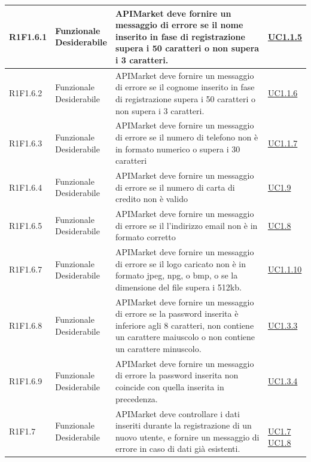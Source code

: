 \documentclass[12pt,a4paper,titlepage]{article}
\newcommand{\minitab}[2][1]{\begin{tabular}#1 #2\end{tabular}}
\newcommand{\uc}[1]{\hyperref[UC#1]{UC#1}}
\begin{document}
{\begin{longtable}{|m{5em}|m{6em}|m{28em}|m{5em}|}
			\hline
			R1F1.6.1 & \minitab[c]{Funzionale\\Desiderabile} & APIMarket deve fornire un messaggio di errore se il nome inserito in fase di registrazione supera i 50 caratteri o non supera i 3 caratteri. & \uc{1.1.5}\\
			\hline
			R1F1.6.2 & \minitab[c]{Funzionale\\Desiderabile} & APIMarket deve fornire un messaggio di errore se il cognome inserito in fase di registrazione supera i 50 caratteri o non supera i 3 caratteri. & \uc{1.1.6}\\
			\hline
			R1F1.6.3 & \minitab[c]{Funzionale\\Desiderabile} & APIMarket deve fornire un messaggio di errore se il numero di telefono non è in formato numerico o supera i 30 caratteri & \uc{1.1.7}\\
			\hline
			R1F1.6.4 & \minitab[c]{Funzionale\\Desiderabile} & APIMarket deve fornire un messaggio di errore se il numero di carta di credito non è valido & \uc{1.9}\\
			\hline
			R1F1.6.5 & \minitab[c]{Funzionale\\Desiderabile} & APIMarket deve fornire un messaggio di errore se il l'indirizzo email non è in formato corretto & \uc{1.8}\\
			\hline
			R1F1.6.7 & \minitab[c]{Funzionale\\Desiderabile} & APIMarket deve fornire un messaggio di errore se il logo caricato non è in formato jpeg, npg, o bmp, o se la dimensione del file supera i 512kb. & \uc{1.1.10}\\
			\hline
			R1F1.6.8 & \minitab[c]{Funzionale\\Desiderabile} & APIMarket deve fornire un messaggio di errore se la password inserita è inferiore agli 8 caratteri, non contiene un carattere maiuscolo o non contiene un carattere minuscolo. & \uc{1.3.3}\\
			\hline
			R1F1.6.9 & \minitab[c]{Funzionale\\Desiderabile} & APIMarket deve fornire un messaggio di errore la password inserita non coincide con quella inserita in precedenza. & \uc{1.3.4}\\
			\hline
			R1F1.7 & \minitab[c]{Funzionale\\Desiderabile} & APIMarket deve controllare i dati inseriti durante la registrazione di un nuovo utente, e fornire un messaggio di errore in caso di dati già esistenti. & \shortstack[l]{\\\uc{1.7}\\\uc{1.8}}\\

\end{longtable}}
\end{document}
